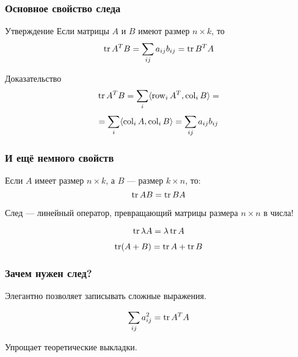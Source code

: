 \begin{frame}
    \frametitle{Основное свойство следа}

\begin{block}{Утверждение}
    Если матрицы $A$ и $B$ имеют размер $n\times k$, то
    \[
    \trace A^T B = \sum_{ij} a_{ij} b_{ij} = \trace B^T A
    \]

\end{block}
\pause

    \begin{block}{Доказательство}
        \[
        \trace A^T B = \sum_i \langle \row_i A^T, \col_i B \rangle =
        \]
        \[ 
         = \sum_i \langle \operatorname{col}_i A, \operatorname{col}_i B \rangle = \sum_{ij} a_{ij} b_{ij}
        \]
    \end{block}
    

\end{frame}


\begin{frame}
    \frametitle{И ещё немного свойств}

    Если $A$ имеет размер $n\times k$, а $B$ — размер $k\times n$, то:
    \[
    \trace AB = \trace BA    
    \]
    \pause

    След — линейный оператор, превращающий матрицы размера $n\times n$ в числа!
    \pause

    \[
    \trace \lambda A = \lambda \trace A    
    \]


    \[
    \trace (A+B) = \trace A + \trace B
    \]


\end{frame}


\begin{frame}
    \frametitle{Зачем нужен след?}

    \pause
    Элегантно позволяет записывать сложные выражения.
    
    \[
    \sum_{ij} a_{ij}^2 = \trace A^T A    
    \]

    \pause
    
    Упрощает теоретические выкладки. 

\end{frame}



